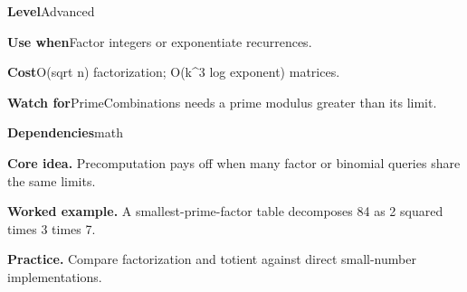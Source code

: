 \documentclass[10pt,letterpaper]{article}
\newcommand{\entrylabel}[1]{\textcolor{accent}{\bfseries #1}}
\begin{document}
\begin{guidebox}\small
\entrylabel{Level}\quad Advanced\par
\entrylabel{Use when}\quad Factor integers or exponentiate recurrences.\par
\entrylabel{Cost}\quad O(sqrt n) factorization; O(k\textasciicircum{}3 log exponent) matrices.\par
\entrylabel{Watch for}\quad PrimeCombinations needs a prime modulus greater than its limit.\par
\entrylabel{Dependencies}\quad math\par
\end{guidebox}
\noindent\textbf{Core idea.} Precomputation pays off when many factor or binomial queries share the same limits.\par
\noindent\textbf{Worked example.} A smallest-prime-factor table decomposes 84 as 2 squared times 3 times 7.\par
\noindent\textbf{Practice.} Compare factorization and totient against direct small-number implementations.\par
\end{document}

